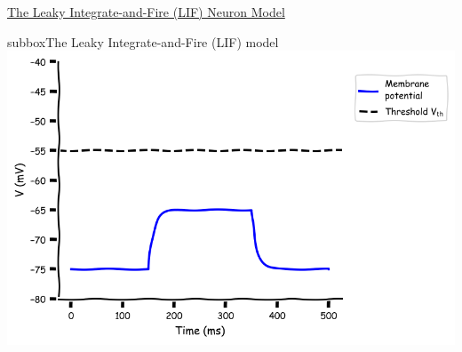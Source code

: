 \begin{textbox}{\href{https://compneuro.neuromatch.io/tutorials/W1D4_GeneralizedLinearModels/student/W1D4_Tutorial1.html}{The Leaky Integrate-and-Fire (LIF) Neuron Model } }
\begin{subbox}{subbox}{The Leaky Integrate-and-Fire (LIF) model}
\centering
\includegraphics[scale=0.15]{Figures/BNM/LIF_Figure1.png}
\end{subbox}

\end{textbox}
